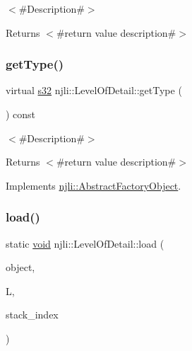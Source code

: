 $<$\#\+Description\#$>$

\begin{DoxyReturn}{Returns}
$<$\#return value description\#$>$ 
\end{DoxyReturn}
\mbox{\label{classnjli_1_1_level_of_detail_a19d0340ade902b34b8369144ba38997b}} 
\subsubsection{\texorpdfstring{get\+Type()}{getType()}}
{\footnotesize\ttfamily virtual \mbox{\hyperlink{_util_8h_aa62c75d314a0d1f37f79c4b73b2292e2}{s32}} njli\+::\+Level\+Of\+Detail\+::get\+Type (\begin{DoxyParamCaption}{ }\end{DoxyParamCaption}) const\hspace{0.3cm}{\ttfamily [virtual]}}

$<$\#\+Description\#$>$

\begin{DoxyReturn}{Returns}
$<$\#return value description\#$>$ 
\end{DoxyReturn}


Implements \mbox{\hyperlink{classnjli_1_1_abstract_factory_object_a207c86146d40d0794708ae7f2d4e60a7}{njli\+::\+Abstract\+Factory\+Object}}.

\mbox{\label{classnjli_1_1_level_of_detail_a508687acaa44f29a4b02d91e949800e8}} 
\subsubsection{\texorpdfstring{load()}{load()}}
{\footnotesize\ttfamily static \mbox{\hyperlink{_thread_8h_af1e856da2e658414cb2456cb6f7ebc66}{void}} njli\+::\+Level\+Of\+Detail\+::load (\begin{DoxyParamCaption}\item[{\mbox{\hyperlink{classnjli_1_1_level_of_detail}{Level\+Of\+Detail}} \&}]{object,  }\item[{lua\+\_\+\+State $\ast$}]{L,  }\item[{int}]{stack\+\_\+index }\end{DoxyParamCaption})\hspace{0.3cm}{\ttfamily [static]}}

